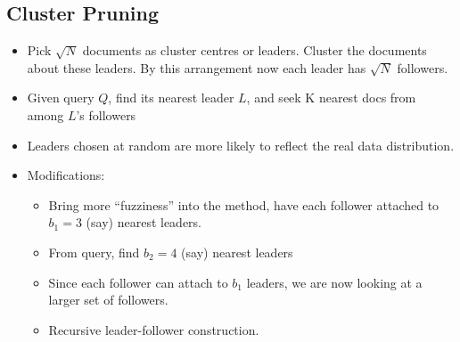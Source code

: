 \documentclass{article}
\begin{document}
\subsection{Cluster Pruning}
\begin{itemize}
    \item Pick $\sqrt{N}$ documents as cluster centres or leaders. Cluster the documents about these leaders. By this arrangement now each leader has $\sqrt{N}$ followers.
    
    \item Given query $Q$, find its nearest leader $L$, and seek K nearest docs from among $L$’s followers
    
    \item Leaders chosen at random are more likely to reflect the real data distribution. 
    
    \item Modifications: 
    \begin{itemize}
        \item Bring more “fuzziness” into the method, have each follower attached to $b_1=3$ (say) nearest leaders.
        
        \item From query, find $b_2=4$ (say) nearest leaders
        
        \item Since each follower can attach to $b_1$ leaders, we are now looking at a larger set of followers.
        
        \item Recursive leader-follower construction. 
    \end{itemize}
\end{itemize}
\end{document}
